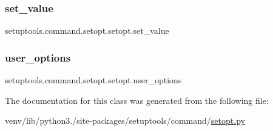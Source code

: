 \subsubsection{\texorpdfstring{set\+\_\+value}{set\_value}}
{\footnotesize\ttfamily setuptools.\+command.\+setopt.\+setopt.\+set\+\_\+value}

\mbox{\label{classsetuptools_1_1command_1_1setopt_1_1setopt_af7d52515830d41afde5a8167f64f7d3d}} 
\subsubsection{\texorpdfstring{user\+\_\+options}{user\_options}}
{\footnotesize\ttfamily setuptools.\+command.\+setopt.\+setopt.\+user\+\_\+options\hspace{0.3cm}{\ttfamily [static]}}



The documentation for this class was generated from the following file\+:\begin{DoxyCompactItemize}
\item 
venv/lib/python3./site-\/packages/setuptools/command/\hyperlink{setopt_8py}{setopt.\+py}\end{DoxyCompactItemize}
